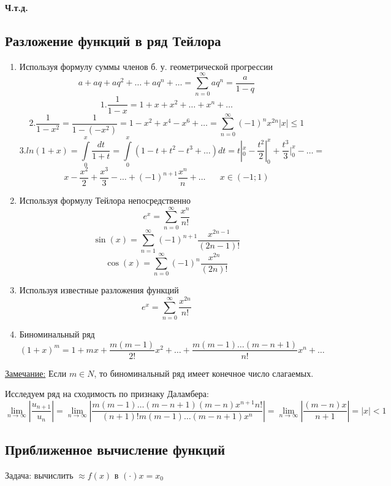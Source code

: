\documentclass[12pt]{article}
\let\oldint\int
\let\oldsum\sum
\let\oldlim\lim
\renewcommand{\int}{\oldint\limits}
\renewcommand{\sum}{\oldsum\limits}
\renewcommand{\lim}{\oldlim\limits}
\begin{document}
    \begin{center}
      \textbf{Ч.т.д.}
    \end{center}

    \subsection{Разложение функций в ряд Тейлора}
    \begin{enumerate}
      \item Используя формулу суммы членов б. у. геометрической прогрессии
      \[a+aq+aq^2+\dots+aq^n+\dots=\sum_{n=0}^{\infty}aq^n=\frac{a}{1-q}\]
      \[1. \frac{1}{1-x}=1+x+x^2+\dots+x^n+\dots\]
      \[2. \frac{1}{1-x^2}=\frac{1}{1-(-x^2)}=1-x^2+x^4-x^6+\dots=\sum_{n=0}^{\infty}(-1)^n x^{2n} |x|\leq 1\]
      \[3. ln(1+x)=\int_{0}^{x}\frac{dt}{1+t}=\int_{0}^{x}(1-t+t^2-t^3+\dots)dt=t|^x_0-\frac{t^2}{2}|^x_0+\frac{t^3}{3}|^x_0-\dots=\]
      \[x-\frac{x^2}{2}+\frac{x^3}{3}-\dots+(-1)^{n+1}\frac{x^n}{n}+\dots \hspace{20pt} x \in (-1;1)\]

      \item Используя формулу Тейлора непосредственно
      \[e^x=\sum_{n=0}^{\infty}\frac{x^n}{n!}\]
      \[\sin(x)=\sum_{n=1}^{\infty}(-1)^{n+1}\frac{x^{2n-1}}{(2n-1)!}\]
      \[\cos(x)=\sum_{n=0}^{\infty}(-1)^n \frac{x^{2n}}{(2n)!}\]

      \item Используя известные разложения функций
      \[e^x=\sum_{n=0}^{\infty} \frac{x^{2n}}{n!}\]

      \item Биноминальный ряд
      \[(1+x)^m=1+mx+\frac{m(m-1)}{2!}x^2+\dots+\frac{m(m-1)\dots(m-n+1)}{n!}x^n+\dots\]
    \end{enumerate}

    \underline{Замечание:} Если $m \in N$, то биноминальный ряд имеет конечное число слагаемых.

    Исследуем ряд на сходимость по признаку Даламбера:
    \[\lim_{n \to \infty} |\frac{u_{n+1}}{u_n}|=
    \lim_{n \to \infty}|\frac{m(m-1)\dots(m-n+1)(m-n)x^{n+1}n!}{(n+1)!m(m-1)\dots(m-n+1)x^n}|=
    \lim_{n \to \infty} |\frac{(m-n)x}{n+1}|=|x|<1\]

    \subsection*{Приближенное вычисление функций}
    Задача: вычислить $\approx f(x)$ в $(\cdot) x=x_0$\\
    
\end{document}
